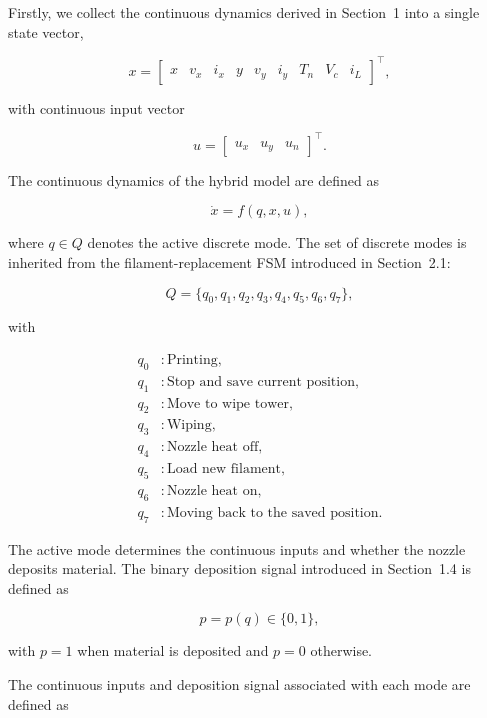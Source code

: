 \documentclass[11pt,a4paper]{article}
\begin{document}
Firstly, we collect the continuous dynamics derived in Section~1 into a single state vector,

\[
x =
\begin{bmatrix}
x & v_x & i_x &
y & v_y & i_y &
T_n & V_c & i_L
\end{bmatrix}^{\top},
\]

with continuous input vector

\[
u =
\begin{bmatrix}
u_x & u_y & u_n
\end{bmatrix}^{\top}.
\]

The continuous dynamics of the hybrid model are defined as

\[
\dot{x}=f(q,x,u),
\]

where \(q\in Q\) denotes the active discrete mode. The set of discrete modes is inherited from the filament-replacement FSM introduced in Section~2.1:

\[
Q=
\{
q_0,q_1,q_2,q_3,q_4,q_5,q_6,q_7
\},
\]

with

\[
\begin{aligned}
q_0 &: \text{Printing},\\
q_1 &: \text{Stop and save current position},\\
q_2 &: \text{Move to wipe tower},\\
q_3 &: \text{Wiping},\\
q_4 &: \text{Nozzle heat off},\\
q_5 &: \text{Load new filament},\\
q_6 &: \text{Nozzle heat on},\\
q_7 &: \text{Moving back to the saved position}.
\end{aligned}
\]

The active mode determines the continuous inputs and whether the nozzle deposits material.
The binary deposition signal introduced in Section~1.4 is defined as

\[
p=p(q)\in\{0,1\},
\]

with \(p=1\) when material is deposited and \(p=0\) otherwise.

The continuous inputs and deposition signal associated with each mode are defined as
\end{document}
